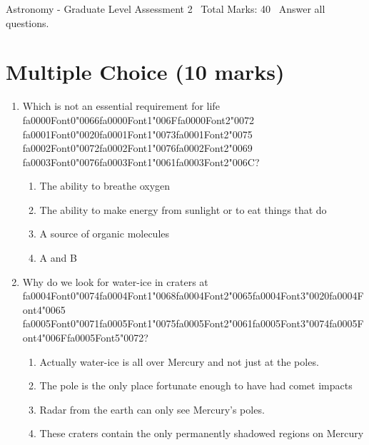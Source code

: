 \documentclass[12pt]{article}
\begin{document}
\begin{center}
Astronomy - Graduate Level Assessment 2 \
Total Marks: 40 \
Answer all questions.
\end{center}

\section*{Multiple Choice (10 marks)}
\begin{enumerate}[label=\arabic*.]
\item Which is not an essential requirement for life {\csname fa0000Font0\endcsname\char"0066}{\csname fa0000Font1\endcsname\char"006F}{\csname fa0000Font2\endcsname\char"0072} {\csname fa0001Font0\endcsname\char"0020}{\csname fa0001Font1\endcsname\char"0073}{\csname fa0001Font2\endcsname\char"0075} {\csname fa0002Font0\endcsname\char"0072}{\csname fa0002Font1\endcsname\char"0076}{\csname fa0002Font2\endcsname\char"0069} {\csname fa0003Font0\endcsname\char"0076}{\csname fa0003Font1\endcsname\char"0061}{\csname fa0003Font2\endcsname\char"006C}?
\begin{enumerate}[label=(\alph*)]
    \item The ability to breathe oxygen
    \item The ability to make energy from sunlight or to eat things that do
    \item A source of organic molecules
    \item A and B
\end{enumerate}
\item Why do we look for water-ice in craters at {\csname fa0004Font0\endcsname\char"0074}{\csname fa0004Font1\endcsname\char"0068}{\csname fa0004Font2\endcsname\char"0065}{\csname fa0004Font3\endcsname\char"0020}{\csname fa0004Font4\endcsname\char"0065} {\csname fa0005Font0\endcsname\char"0071}{\csname fa0005Font1\endcsname\char"0075}{\csname fa0005Font2\endcsname\char"0061}{\csname fa0005Font3\endcsname\char"0074}{\csname fa0005Font4\endcsname\char"006F}{\csname fa0005Font5\endcsname\char"0072}?
\begin{enumerate}[label=(\alph*)]
    \item Actually water-ice is all over Mercury and not just at the poles.
    \item The pole is the only place fortunate enough to have had comet impacts
    \item Radar from the earth can only see Mercury's poles.
    \item These craters contain the only permanently shadowed regions on Mercury

\end{enumerate}
\end{enumerate}
\end{document}
